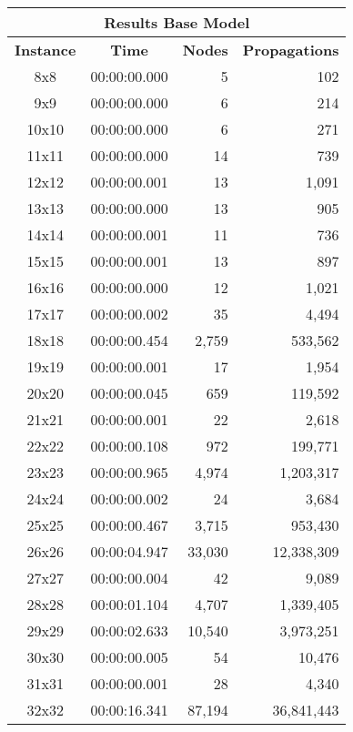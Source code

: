 
\begin{center}
    \begin{tabular}{|c|c|r|r|}
        \hline
        \multicolumn{4}{|c|}{\textbf{Results Base Model}} \\
        \hline
        \textbf{Instance} & \textbf{Time} & \textbf{Nodes} & \textbf{Propagations} \\
        
        \hline
		8x8 & 00:00:00.000 & 5 & 102 \\ \hline
		9x9 & 00:00:00.000 & 6 & 214 \\ \hline
		10x10 & 00:00:00.000 & 6 & 271 \\ \hline
		11x11 & 00:00:00.000 & 14 & 739 \\ \hline
		12x12 & 00:00:00.001 & 13 & 1,091 \\ \hline
		13x13 & 00:00:00.000 & 13 & 905 \\ \hline
		14x14 & 00:00:00.001 & 11 & 736 \\ \hline
		15x15 & 00:00:00.001 & 13 & 897 \\ \hline
		16x16 & 00:00:00.000 & 12 & 1,021 \\ \hline
		17x17 & 00:00:00.002 & 35 & 4,494 \\ \hline
		18x18 & 00:00:00.454 & 2,759 & 533,562 \\ \hline
		19x19 & 00:00:00.001 & 17 & 1,954 \\ \hline
		20x20 & 00:00:00.045 & 659 & 119,592 \\ \hline
		21x21 & 00:00:00.001 & 22 & 2,618 \\ \hline
		22x22 & 00:00:00.108 & 972 & 199,771 \\ \hline
		23x23 & 00:00:00.965 & 4,974 & 1,203,317 \\ \hline
		24x24 & 00:00:00.002 & 24 & 3,684 \\ \hline
		25x25 & 00:00:00.467 & 3,715 & 953,430 \\ \hline
		26x26 & 00:00:04.947 & 33,030 & 12,338,309 \\ \hline
		27x27 & 00:00:00.004 & 42 & 9,089 \\ \hline
		28x28 & 00:00:01.104 & 4,707 & 1,339,405 \\ \hline
		29x29 & 00:00:02.633 & 10,540 & 3,973,251 \\ \hline
		30x30 & 00:00:00.005 & 54 & 10,476 \\ \hline
		31x31 & 00:00:00.001 & 28 & 4,340 \\ \hline
		32x32 & 00:00:16.341 & 87,194 & 36,841,443 \\ \hline

\end{tabular}
\end{center}
